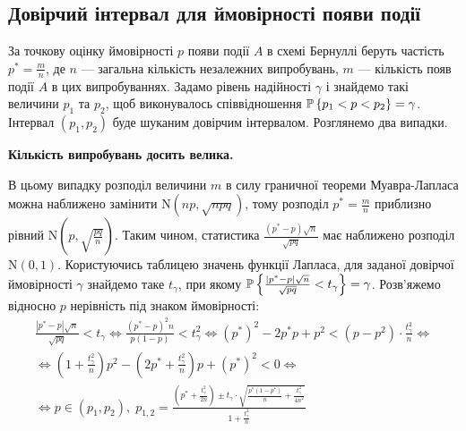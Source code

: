 \subsection{Довірчий інтервал для ймовірності появи події}
За точкову оцінку ймовірності $p$ появи події $A$
в схемі Бернуллі беруть частість $p^* = \frac{m}{n}$, де $n$ ---
загальна кількість незалежних випробувань,
$m$ --- кількість появ події $A$ в цих випробуваннях.
Задамо рівень надійності $\gamma$
і знайдемо такі величини $p_1$ та $p_2$, щоб
виконувалось співвідношення $\P\left\{ p_1 < p < p_2\right\} = \gamma$.
Інтервал $(p_1, p_2)$ буде шуканим довірчим інтервалом. Розглянемо два випадки.

\noindent\textbf{Кількість випробувань досить велика.} 

В цьому випадку розподіл величини $m$ в силу граничної теореми Муавра-Лапласа 
можна наближено замінити $\mathrm{N}(np, \sqrt{npq})$, тому
розподіл $p^* = \frac{m}{n}$ приблизно рівний $\mathrm{N}\left(p, \sqrt{\frac{pq}{n}} \right)$.
Таким чином, статистика $\frac{(p^* - p)\sqrt{n}}{\sqrt{pq}}$ має наближено розподіл $\mathrm{N}(0, 1)$.
Користуючись таблицею значень функції Лапласа, для заданої довірчої ймовірності $\gamma$ знайдемо таке $t_{\gamma}$,
при якому 
$\P\left\{\frac{|p^* - p|\sqrt{n}}{\sqrt{pq}} < t_{\gamma}\right\} = \gamma$. Розв'яжемо відносно $p$ нерівність під знаком ймовірності:
\begin{gather*}
    \frac{|p^* - p|\sqrt{n}}{\sqrt{pq}} < t_{\gamma} \Leftrightarrow
    \frac{(p^* - p)^2 n}{p(1-p)} < t^2_{\gamma} \Leftrightarrow
    (p^*)^2 - 2p^* p + p^2 < \left(p - p^2\right)\cdot \frac{t^2_{\gamma}}{n} \Leftrightarrow \\
    \Leftrightarrow
    \left(1 + \frac{t^2_{\gamma}}{n}\right)p^2 - \left(2p^* + \frac{t^2_{\gamma}}{n}\right)p + (p^*)^2 < 0 \Leftrightarrow \\
    \Leftrightarrow
    p \in (p_1, p_2), \; p_{1, 2} = \frac{\left(p^* + \frac{t^2_{\gamma}}{2n}\right) \pm t_{\gamma} \cdot \sqrt{\frac{p^*(1-p^*)}{n} + \frac{t^2_{\gamma}}{4n^2}}}{1 + \frac{t^2_{\gamma}}{n}}
\end{gather*}

